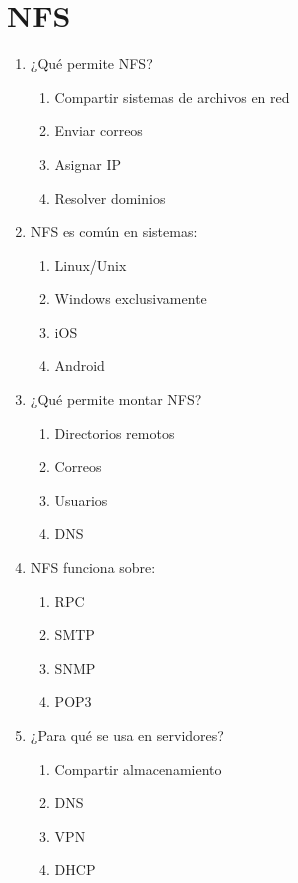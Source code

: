 \documentclass[12pt]{article}
\begin{document}
\section*{NFS}

\begin{enumerate}[label=\textbf{NFS-\arabic*.}]

\item ¿Qué permite NFS?
\begin{enumerate}[label=\alph*)]
\item Compartir sistemas de archivos en red
\item Enviar correos
\item Asignar IP
\item Resolver dominios
\end{enumerate}

\item NFS es común en sistemas:
\begin{enumerate}[label=\alph*)]
\item Linux/Unix
\item Windows exclusivamente
\item iOS
\item Android
\end{enumerate}

\item ¿Qué permite montar NFS?
\begin{enumerate}[label=\alph*)]
\item Directorios remotos
\item Correos
\item Usuarios
\item DNS
\end{enumerate}

\item NFS funciona sobre:
\begin{enumerate}[label=\alph*)]
\item RPC
\item SMTP
\item SNMP
\item POP3
\end{enumerate}

\item ¿Para qué se usa en servidores?
\begin{enumerate}[label=\alph*)]
\item Compartir almacenamiento
\item DNS
\item VPN
\item DHCP
\end{enumerate}

\end{enumerate}
\end{document}
